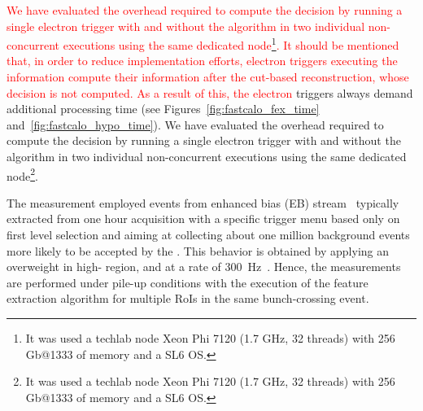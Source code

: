 \textcolor{red}{We have evaluated the overhead required to compute the \rnn decision by running a single electron trigger with and without the \rnn algorithm in two individual non-concurrent executions using the same dedicated node\footnote{It was used a techlab node Xeon Phi 7120 (1.7 GHz, 32 threads) with 256 Gb@1333 of memory and a SL6 OS.}. It should be mentioned that, in order to reduce implementation efforts, electron triggers executing the \rnn information compute their information after the cut-based reconstruction, whose decision is not computed. As a result of this, the \rnn electron }
triggers always demand additional \fastcalo processing time (see Figures~\ref{fig:fastcalo_fex_time}
and~\ref{fig:fastcalo_hypo_time}).  We have evaluated the overhead required to
compute the \rnn decision by running a single electron trigger with and without
the \rnn{} algorithm in two individual non-concurrent executions using the same
dedicated node\footnote{It was used a techlab node Xeon Phi 7120 (1.7 GHz, 32 threads) 
	with 256 Gb@1333 of memory and a SL6 OS.}.

The measurement employed events from enhanced bias (EB)
stream~\cite{eb_description} typically extracted from one hour acquisition with
a specific trigger menu based only on first level selection and aiming at
collecting about one million background events more likely to be accepted by the
\hlt{}. This behavior is obtained by applying an overweight in high-\pt{} region,
and at a rate of \SI{300}{\hertz}~\cite{eb_specifications}. Hence, the
measurements are performed under pile-up conditions with the execution of the
feature extraction algorithm for multiple RoIs in the same bunch-crossing event.


